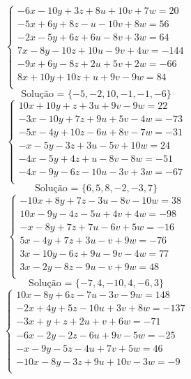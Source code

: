 \documentclass[12pt,oneside,a4paper]{article}
\begin{document}
\vspace{\baselineskip}
\begin{equation*}
\begin{cases}
-6x-10y+3z+8u+10v+7w=20 \\
-5x+6y+8z-u-10v+8w=56 \\
-2x-5y+6z+6u-8v+3w=64 \\
7x-8y-10z+10u-9v+4w=-144 \\
-9x+6y-8z+2u+5v+2w=-66 \\
8x+10y+10z+u+9v-9w=84 \\
\end{cases}
\end{equation*}
\begin{equation*}
\text{Solução = }\{-5,-2,10,-1,-1,-6\}
\end{equation*}
\vspace{\baselineskip}
\begin{equation*}
\begin{cases}
10x+10y+z+3u+9v-9w=22 \\
-3x-10y+7z+9u+5v-4w=-73 \\
-5x-4y+10z-6u+8v-7w=-31 \\
-x-5y-3z+3u-5v+10w=24 \\
-4x-5y+4z+u-8v-8w=-51 \\
-4x-9y-6z-10u-3v+3w=-67 \\
\end{cases}
\end{equation*}
\begin{equation*}
\text{Solução = }\{6,5,8,-2,-3,7\}
\end{equation*}
\vspace{\baselineskip}
\begin{equation*}
\begin{cases}
-10x+8y+7z-3u-8v-10w=38 \\
10x-9y-4z-5u+4v+4w=-98 \\
-x-8y+7z+7u-6v+5w=-16 \\
5x-4y+7z+3u-v+9w=-76 \\
3x-10y-6z+9u-9v-4w=77 \\
3x-2y-8z-9u-v+9w=48 \\
\end{cases}
\end{equation*}
\begin{equation*}
\text{Solução = }\{-7,4,-10,4,-6,3\}
\end{equation*}
\vspace{\baselineskip}
\begin{equation*}
\begin{cases}
10x-8y+6z-7u-3v-9w=148 \\
-2x+4y+5z-10u+3v+8w=-137 \\
-3x+y+z+2u+v+6w=-71 \\
-6x-2y-2z-6u+9v-5w=-25 \\
-x-9y-5z-4u+7v+5w=46 \\
-10x-8y-3z+9u+10v-3w=-9 \\
\end{cases}
\end{equation*}
\end{document}
